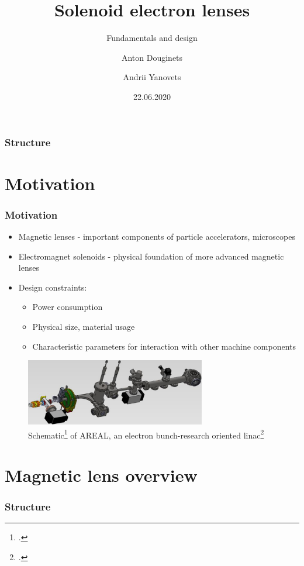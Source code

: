 \documentclass[10pt]{beamer}
\title{Solenoid electron lenses}
\subtitle{Fundamentals and design}
\author{Anton Douginets \and Andrii Yanovets}
\date{22.06.2020}
\newcommand{\rfn}{\setcounter{footnote}{0}}
\newcommand{\tocslide}{
\begin{frame}
  \frametitle{Structure}
  \tableofcontents[currentsection]
\end{frame}
}
\begin{document}
\begin{frame}[plain]
  \titlepage
\end{frame}

\begin{frame}
  \frametitle{Structure}
  \tableofcontents%
\end{frame}

\section{Motivation}

\begin{frame}
  \frametitle{Motivation}
  \rfn
  \begin{itemize}
    \item Magnetic lenses - important components of particle accelerators, microscopes
    \item Electromagnet solenoids - physical foundation of more advanced magnetic lenses
    \item Design constraints:
    \begin{itemize}
      \item Power consumption
      \item Physical size, material usage
      \item Characteristic parameters for interaction with other machine components
    \end{itemize}
  \end{itemize}
  \begin{figure}
  \centering
    \includegraphics[width=0.7\textwidth]{AREAL}
    \caption{Schematic\footcite{Grigoryan2014} of AREAL, an electron bunch-research oriented linac\footcite{Grigoryan2011}}

  \end{figure}
\end{frame}

\section{Magnetic lens overview}
\tocslide
\end{document}
